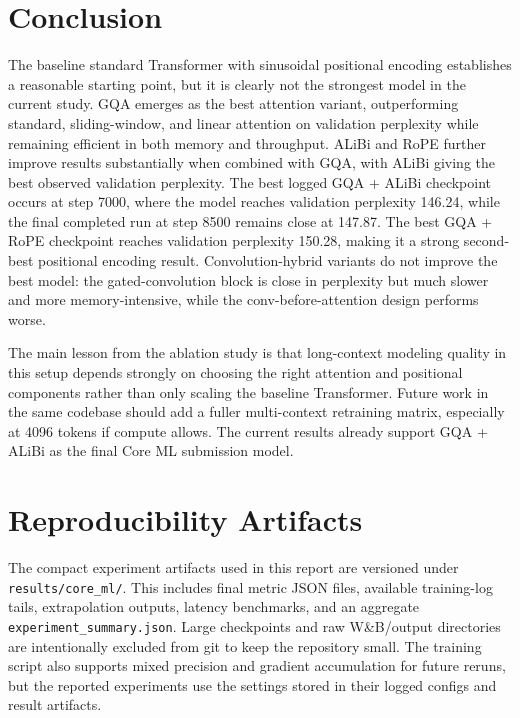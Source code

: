 \documentclass{article}
\begin{document}
\section{Conclusion}

The baseline standard Transformer with sinusoidal positional encoding establishes
a reasonable starting point, but it is clearly not the strongest model in the
current study. GQA emerges as the best attention variant, outperforming
standard, sliding-window, and linear attention on validation perplexity while
remaining efficient in both memory and throughput. ALiBi and RoPE further
improve results substantially when combined with GQA, with ALiBi giving the best
observed validation perplexity. The best logged GQA + ALiBi checkpoint occurs at
step 7000, where the model reaches validation perplexity 146.24, while the final
completed run at step 8500 remains close at 147.87. The best GQA + RoPE
checkpoint reaches validation perplexity 150.28, making it a strong second-best
positional encoding result. Convolution-hybrid variants do not improve the best
model: the gated-convolution block is close in perplexity but much slower and
more memory-intensive, while the conv-before-attention design performs worse.

The main lesson from the ablation study is that long-context modeling quality in
this setup depends strongly on choosing the right attention and positional
components rather than only scaling the baseline Transformer. Future work in the
same codebase should add a fuller multi-context retraining matrix, especially at
4096 tokens if compute allows. The current results already support GQA + ALiBi
as the final Core ML submission model.

\section{Reproducibility Artifacts}

The compact experiment artifacts used in this report are versioned under
\texttt{results/core\_ml/}. This includes final metric JSON files, available
training-log tails, extrapolation outputs, latency benchmarks, and an aggregate
\texttt{experiment\_summary.json}. Large checkpoints and raw W\&B/output
directories are intentionally excluded from git to keep the repository small.
The training script also supports mixed precision and gradient accumulation for
future reruns, but the reported experiments use the settings stored in their
logged configs and result artifacts.
\end{document}
